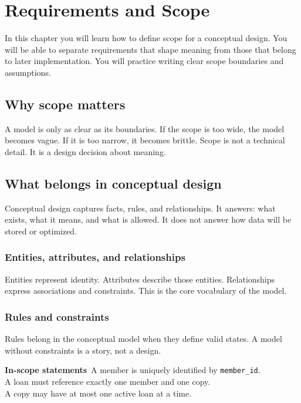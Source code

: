 \chapter{Requirements and Scope}

\begin{learningobjectives}
In this chapter you will learn how to define scope for a conceptual design.
You will be able to separate requirements that shape meaning from those that belong to later implementation.
You will practice writing clear scope boundaries and assumptions.
\end{learningobjectives}

\section{Why scope matters}
A model is only as clear as its boundaries.
If the scope is too wide, the model becomes vague.
If it is too narrow, it becomes brittle.
Scope is not a technical detail.
It is a design decision about meaning.

\section{What belongs in conceptual design}
Conceptual design captures facts, rules, and relationships.
It answers: what exists, what it means, and what is allowed.
It does not answer how data will be stored or optimized.

\subsection{Entities, attributes, and relationships}
Entities represent identity.
Attributes describe those entities.
Relationships express associations and constraints.
This is the core vocabulary of the model.

\subsection{Rules and constraints}
Rules belong in the conceptual model when they define valid states.
A model without constraints is a story, not a design.

\begin{examplebox}
\textbf{In-scope statements}\
A member is uniquely identified by \texttt{member\_id}.\\
A loan must reference exactly one member and one copy.\\
A copy may have at most one active loan at a time.
\end{examplebox}

